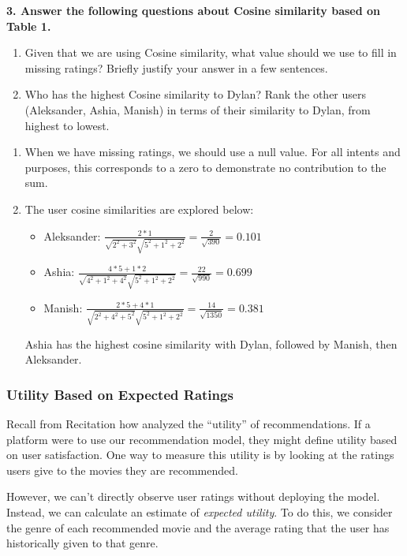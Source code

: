 \documentclass{article}
\begin{document}
\textbf{3. Answer the following questions about Cosine similarity based on Table 1.}
\begin{enumerate}[label=\Alph*.]
\item Given that we are using Cosine similarity, what value should we use to fill in missing ratings? Briefly justify your answer in a few sentences.
\item Who has the highest Cosine similarity to Dylan? Rank the other users (Aleksander, Ashia, Manish) in terms of their similarity to Dylan, from highest to lowest.
\end{enumerate}
\bigskip
\begin{mdframed}
\begin{enumerate}[label=\Alph*.]
\item When we have missing ratings, we should use a null value. For all intents and purposes, this corresponds to a zero to demonstrate no contribution to the sum. 
\item The user cosine similarities are explored below:
    \begin{itemize}
        \item Aleksander: $\frac{2*1}{\sqrt{2^2 + 3^2}\sqrt{5^2+1^2+2^2}} = \frac{2}{\sqrt{390}}=0.101$
        \item Ashia: $\frac{4*5 + 1*2}{\sqrt{4^2 + 1^2 + 4^2}\sqrt{5^2+1^2+2^2}} = \frac{22}{\sqrt{990}}=0.699$
        \item Manish: $\frac{2*5 + 4*1}{\sqrt{2^2 + 4^2 + 5^2}\sqrt{5^2+1^2+2^2}} = \frac{14}{\sqrt{1350}}=0.381$
    \end{itemize}
    Ashia has the highest cosine similarity with Dylan, followed by Manish, then Aleksander.
\end{enumerate}
\end{mdframed}
\bigskip

\subsubsection*{Utility Based on Expected Ratings}

Recall from Recitation how analyzed the ``utility'' of recommendations.  If a platform were to use our recommendation model, they might define utility based on user satisfaction. One way to measure this utility is by looking at the ratings users give to the movies they are recommended.

However, we can't directly observe user ratings without deploying the model. Instead, we can calculate an estimate of \textit{expected utility}. To do this, we consider the genre of each recommended movie and the average rating that the user has historically given to that genre.
\end{document}
